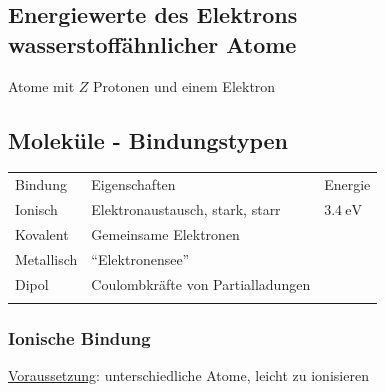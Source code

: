\begin{sectionbox}
    \subsection{Energiewerte des Elektrons wasserstoffähnlicher Atome}
    Atome mit $Z$ Protonen und einem Elektron
    \begin{center}
    \end{center}
\end{sectionbox}

\begin{sectionbox}
    \subsection{Moleküle - Bindungstypen}
    \begin{tabular*}{\columnwidth}{@{\extracolsep\fill}lll@{}}
        \ctrule
        Bindung & Eigenschaften & Energie \\\cmrule
        Ionisch & Elektronaustausch, stark, starr & $\SI{3.4}{\electronvolt}$ \\
        Kovalent & Gemeinsame Elektronen & \\
        Metallisch & "`Elektronensee"' &  \\
        Dipol & Coulombkräfte von Partialladungen  & \\
        \ctrule
    \end{tabular*}

    \subsubsection{Ionische Bindung }
    \underline{Voraussetzung}: unterschiedliche Atome, leicht zu ionisieren


\end{sectionbox}
